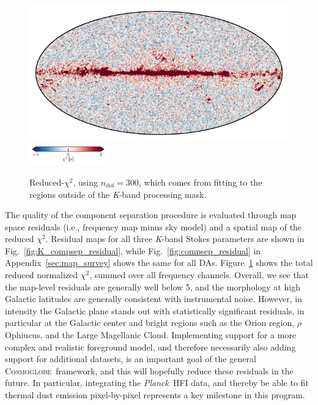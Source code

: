 \documentclass[twocolumn]{../../common/aa}
\def\Planck{\emph{Planck}}
\newcommand{\cosmoglobe}{\textsc{Cosmoglobe}}
\newcommand{\K}[0]{\textit K}
\begin{document}
\begin{figure}
	\centering
	\includegraphics[width=\linewidth]{figures/chisq_IQU.pdf}\\
	\includegraphics[width=0.3\textwidth]{figures/cbar_3sigma.pdf}
	\caption{Reduced-$\chi^2$, using $n_\mathrm{dof}=300$, which comes from fitting to the regions outside of the \K-band processing mask.}\label{fig:reduced_chisq}
\end{figure}

The quality of the component separation procedure is evaluated through map space residuals (i.e., frequency map minus sky model) and a spatial map of the reduced $\chi^2$. Residual maps for all three \K-band Stokes parameters are shown in Fig.~\ref{fig:K_compsep_residual}, while Fig.~\ref{fig:compsep_residual} in Appendix~\ref{sec:map_survey} shows the same for all DAs. Figure~\ref{fig:reduced_chisq} shows the total reduced normalized $\chi^2$, summed over all frequency channels. Overall, we see that the map-level residuals are generally well below 5\muK, and the morphology at high Galactic latitudes are generally consistent with instrumental noise. However, in intensity the Galactic plane stands out with statistically significant residuals, in particular at the Galactic center and bright regions such as the Orion region, $\rho$ Ophiucus, and the Large Magellanic Cloud. Implementing support for a more complex and realistic foreground model, and therefore necessarily also adding support for additional datasets, is an important goal of the general \cosmoglobe\ framework, and this will hopefully reduce these residuals in the future. In particular, integrating the \Planck\ HFI data, and thereby be able to fit thermal dust emission pixel-by-pixel represents a key milestone in this program. 
\end{document}
